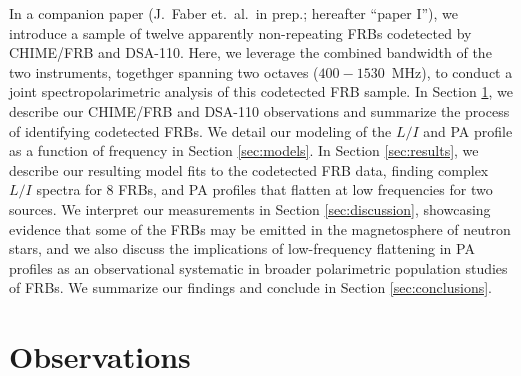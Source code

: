 \documentclass[twocolumn, linenumbers]{aastex701}
\begin{document}
In a companion paper (J.~Faber et.~al.~in prep.; hereafter ``paper I''), we introduce a sample of twelve apparently non-repeating FRBs codetected by CHIME/FRB and DSA-110. Here, we leverage the combined bandwidth of the two instruments, togethger spanning two octaves ($400-1530$~MHz), to conduct a joint spectropolarimetric analysis of this codetected FRB sample. In Section \ref{sec:obs}, we describe our CHIME/FRB and DSA-110 observations and summarize the process of identifying codetected FRBs. We detail our modeling of the $L/I$ and PA profile as a function of frequency in Section \ref{sec:models}. In Section \ref{sec:results}, we describe our resulting model fits to the codetected FRB data, finding complex $L/I$ spectra for 8 FRBs, and PA profiles that flatten at low frequencies for two sources. We interpret our measurements in Section \ref{sec:discussion}, showcasing evidence that some of the FRBs may be emitted in the magnetosphere of neutron stars, and we also discuss the implications of low-frequency flattening in PA profiles as an observational systematic in broader polarimetric population studies of FRBs. We summarize our findings and conclude in Section \ref{sec:conclusions}. 


\section{Observations} \label{sec:obs}
\end{document}
